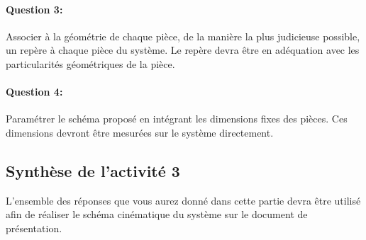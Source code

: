 \paragraph{Question 3:} Associer à la géométrie de chaque pièce, de la manière la plus judicieuse possible, un repère à chaque pièce du système. Le repère devra être en adéquation avec les particularités géométriques de la pièce.

\paragraph{Question 4:} Paramétrer le schéma proposé en intégrant les dimensions fixes des pièces. Ces dimensions devront être mesurées sur le système directement.

\reponse[4]

\subsection{Synthèse de l'activité 3}

L'ensemble des réponses que vous aurez donné dans cette partie devra être utilisé afin de réaliser le schéma cinématique du système sur le document de présentation.


